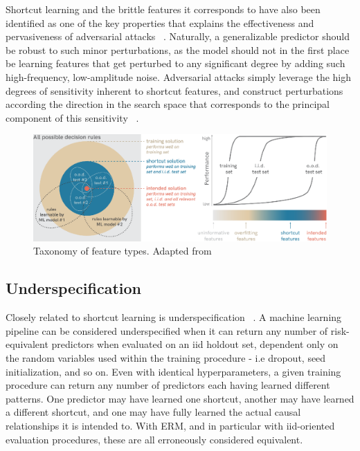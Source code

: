 	Shortcut learning and the brittle features it corresponds to have also been identified as one of the key properties that explains the effectiveness and pervasiveness of adversarial attacks ~\cite{adversarial_bugs_features}. Naturally, a generalizable predictor should be robust to such minor perturbations, as the model should not in the first place be learning features that get perturbed to any significant degree by adding such high-frequency, low-amplitude noise. Adversarial attacks simply leverage the high degrees of sensitivity inherent to shortcut features, and construct perturbations according the direction in the search space that corresponds to the principal component of this sensitivity ~\cite{sensitivity}. 

	\begin{figure}[h]
		\includegraphics[width=\linewidth]{illustrations/features.png}
		\caption{Taxonomy of feature types. Adapted from ~\cite{shortcut_learning}}
		\label{feature_types}
	\end{figure}


	\subsection{Underspecification}
	Closely related to shortcut learning is underspecification ~\cite{damour2020underspecification}. A machine learning pipeline can be considered underspecified when it can return any number of risk-equivalent predictors when evaluated on an iid holdout set, dependent only on the random variables used within the training procedure - i.e dropout, seed initialization, and so on. Even with identical hyperparameters, a given training procedure can return any number of predictors each having learned different patterns. One predictor may have learned one shortcut, another may have learned a different shortcut, and one may have fully learned the actual causal relationships it is intended to. With ERM, and in particular with iid-oriented evaluation procedures, these are all erroneously considered equivalent. 

